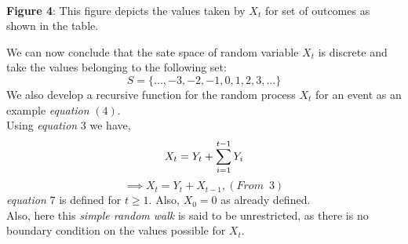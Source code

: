 \documentclass[12pt,a4paper]{article}%
\begin{document}
\begin{flushleft}
\begin{center}
		\\\textbf{Figure 4}: This figure depicts the values taken by $X_{t}$ for set of outcomes as shown in the table.
	\end{center}
	\end{flushleft}
	\pagebreak
	We can now conclude that the sate space of random variable $X_{t}$ is discrete and take the values belonging to the following set:\\
	\begin{equation}
		S={\{...,-3,-2,-1,0,1,2,3,...\}}
	\end{equation}
	We also develop a recursive function for the random process $X_{t}$ for an event as an example \textit{equation} $(4)$.\\
	Using \textit{equation} $3$ we have,
	\begin{equation}
		X_{t} = Y_{t} + \sum_{\mathclap{i=1}}^{t-1} Y_{i}
	\end{equation} 
	\begin{equation}
		\implies X_{t} = Y_{t} + X_{t-1}, (From\enspace 3)
	\end{equation}
	\textit{equation} $7$ is defined for $t \geq 1$. Also, $X_{0}=0$ as already defined.\\Also, here this \textit{simple random walk} is said to be unrestricted, as there is no boundary condition on the values possible for $X_{t}$.
\end{document}
